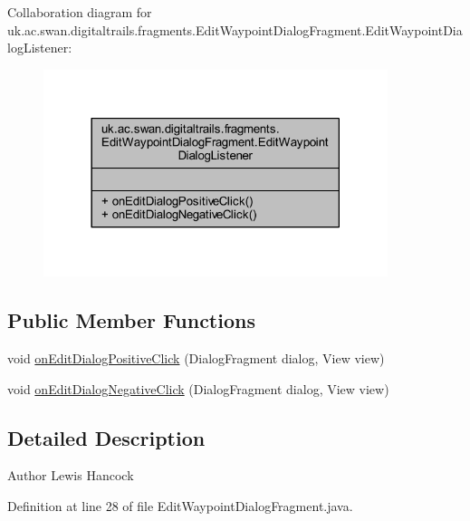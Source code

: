 Collaboration diagram for uk.\+ac.\+swan.\+digitaltrails.\+fragments.\+Edit\+Waypoint\+Dialog\+Fragment.\+Edit\+Waypoint\+Dialog\+Listener\+:
\nopagebreak
\begin{figure}[H]
\begin{center}
\leavevmode
\includegraphics[width=285pt]{interfaceuk_1_1ac_1_1swan_1_1digitaltrails_1_1fragments_1_1_edit_waypoint_dialog_fragment_1_1_eda9048fc745689e0c7d076f4bbcaa77b5}
\end{center}
\end{figure}
\subsection*{Public Member Functions}
\begin{DoxyCompactItemize}
\item 
void \hyperlink{interfaceuk_1_1ac_1_1swan_1_1digitaltrails_1_1fragments_1_1_edit_waypoint_dialog_fragment_1_1_edit_waypoint_dialog_listener_a2fe2b638cb6d20f439378c5f5b87508d}{on\+Edit\+Dialog\+Positive\+Click} (Dialog\+Fragment dialog, View view)
\item 
void \hyperlink{interfaceuk_1_1ac_1_1swan_1_1digitaltrails_1_1fragments_1_1_edit_waypoint_dialog_fragment_1_1_edit_waypoint_dialog_listener_a990bd023f41835e39430309ff3398e00}{on\+Edit\+Dialog\+Negative\+Click} (Dialog\+Fragment dialog, View view)
\end{DoxyCompactItemize}


\subsection{Detailed Description}
\begin{DoxyAuthor}{Author}
Lewis Hancock 
\end{DoxyAuthor}


Definition at line 28 of file Edit\+Waypoint\+Dialog\+Fragment.\+java.



